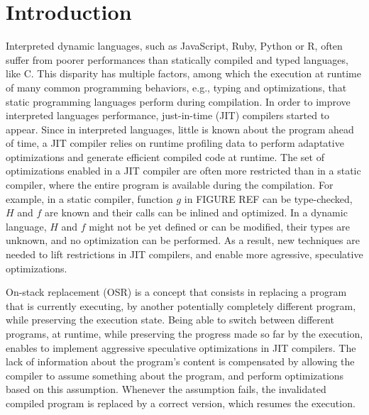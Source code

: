 
\chapter{Introduction} %

\label{Chapter1} %


\newcommand{\keyword}[1]{\textbf{#1}}
\newcommand{\tabhead}[1]{\textbf{#1}}
\newcommand{\code}[1]{\texttt{#1}}
\newcommand{\file}[1]{\texttt{\bfseries#1}}
\newcommand{\option}[1]{\texttt{\itshape#1}}


Interpreted dynamic languages, such as JavaScript, Ruby, Python or R, often suffer from poorer performances than statically compiled and typed languages, like C.
This disparity has multiple factors, among which the execution at runtime of many common programming behaviors, e.g., typing and optimizations, that static programming languages perform during compilation.
In order to improve interpreted languages performance, just-in-time (JIT) compilers started to appear.
Since in interpreted languages, little is known about the program ahead of time, a JIT compiler relies on runtime profiling data to perform adaptative optimizations and generate efficient compiled code at runtime.
The set of optimizations enabled in a JIT compiler are often more restricted than in a static compiler, where the entire program is available during the compilation.
For example, in a static compiler, function $g$ in FIGURE REF can be type-checked, $H$ and $f$ are known and their calls can be inlined and optimized.
In a dynamic language, $H$ and $f$ might not be yet defined or can be modified, their types are unknown, and no optimization can be performed.
As a result, new techniques are needed to lift restrictions in JIT compilers, and enable more agressive, speculative optimizations.\\


On-stack replacement (OSR) is a concept that consists in replacing a program that is currently executing, by another potentially completely different program, while preserving the execution state.
Being able to switch between different programs, at runtime, while preserving the progress made so far by the execution, enables to implement aggressive speculative optimizations in JIT compilers.
The lack of information about the program's content is compensated by allowing the compiler to assume something about the program, and perform optimizations based on this assumption.
Whenever the assumption fails, the invalidated compiled program is replaced by a correct version, which resumes the execution.\\

